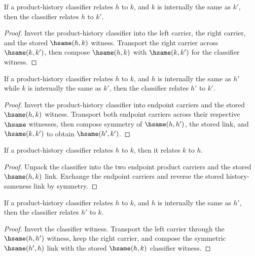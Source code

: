 \begin{theorem}
\label{thm:prod-history-classifier-right-hsame-transport}
If a product-history classifier relates $h$ to $k$, and $k$ is internally the same as $k'$, then the classifier relates $h$ to $k'$.
\end{theorem}
\begin{proof}
Invert the product-history classifier into the left carrier, the right carrier, and the stored $\hsame(h,k)$ witness. Transport the right carrier across $\hsame(k,k')$, then compose $\hsame(h,k)$ with $\hsame(k,k')$ for the classifier witness.
\end{proof}

\begin{theorem}
\label{thm:prod-history-classifier-hsame-transport}
If a product-history classifier relates $h$ to $k$, and $h$ is internally the same as $h'$ while $k$ is internally the same as $k'$, then the classifier relates $h'$ to $k'$.
\end{theorem}
\begin{proof}
Invert the product-history classifier into endpoint carriers and the stored $\hsame(h,k)$ witness. Transport both endpoint carriers across their respective $\hsame$ witnesses, then compose symmetry of $\hsame(h,h')$, the stored link, and $\hsame(k,k')$ to obtain $\hsame(h',k')$.
\end{proof}

\begin{theorem}
\label{thm:prod-history-classifier-symmetry}
If a product-history classifier relates \(h\) to \(k\), then it relates
\(k\) to \(h\).
\end{theorem}
\begin{proof}
Unpack the classifier into the two endpoint product carriers and the stored
\(\hsame(h,k)\) link. Exchange the endpoint carriers and reverse the stored
history-sameness link by symmetry.
\end{proof}

\begin{theorem}
\label{thm:prod-history-classifier-left-hsame-transport}
If a product-history classifier relates $h$ to $k$, and $h$ is internally the
same as $h'$, then the classifier relates $h'$ to $k$.
\end{theorem}
\begin{proof}
Invert the classifier witness. Transport the left carrier through the
$\hsame(h,h')$ witness, keep the right carrier, and compose the symmetric
$\hsame(h',h)$ link with the stored $\hsame(h,k)$ classifier witness.
\end{proof}

